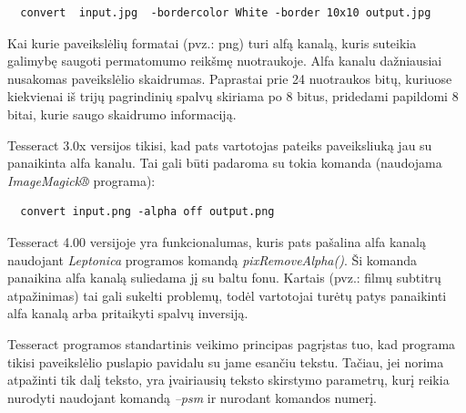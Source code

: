 \documentclass{VUMIFInfBakalaurinis}
\begin{document}
\begin{verbatim}
  convert  input.jpg  -bordercolor White -border 10x10 output.jpg
\end{verbatim}

Kai kurie paveikslėlių formatai (pvz.: png) turi alfą kanalą, kuris suteikia galimybę saugoti permatomumo reikšmę nuotraukoje.
Alfa kanalu dažniausiai nusakomas paveikslėlio skaidrumas. Paprastai prie 24 nuotraukos bitų, kuriuose kiekvienai iš trijų pagrindinių spalvų skiriama po 8 bitus, pridedami papildomi
8 bitai, kurie saugo skaidrumo informaciją. 

Tesseract 3.0x versijos tikisi, kad pats vartotojas pateiks paveiksliuką jau su panaikinta alfa kanalu. Tai gali būti padaroma su tokia komanda (naudojama \textit{ImageMagick®} programa):

\begin{verbatim}
  convert input.png -alpha off output.png
\end{verbatim}

Tesseract 4.00 versijoje yra funkcionalumas, kuris pats pašalina alfa kanalą naudojant \textit{Leptonica} programos komandą \textit{pixRemoveAlpha()}. Ši komanda panaikina alfa kanalą
suliedama jį su baltu fonu. Kartais (pvz.: filmų subtitrų atpažinimas) tai gali sukelti problemų, todėl vartotojai turėtų patys panaikinti alfa kanalą arba pritaikyti spalvų inversiją.

Tesseract programos standartinis veikimo principas pagrįstas tuo, kad programa tikisi paveikslėlio puslapio
pavidalu su jame esančiu tekstu. Tačiau, jei norima atpažinti tik dalį teksto, yra įvairiausių teksto skirstymo 
parametrų, kurį reikia nurodyti naudojant komandą \textit{--psm} ir nurodant komandos numerį.
\end{document}
